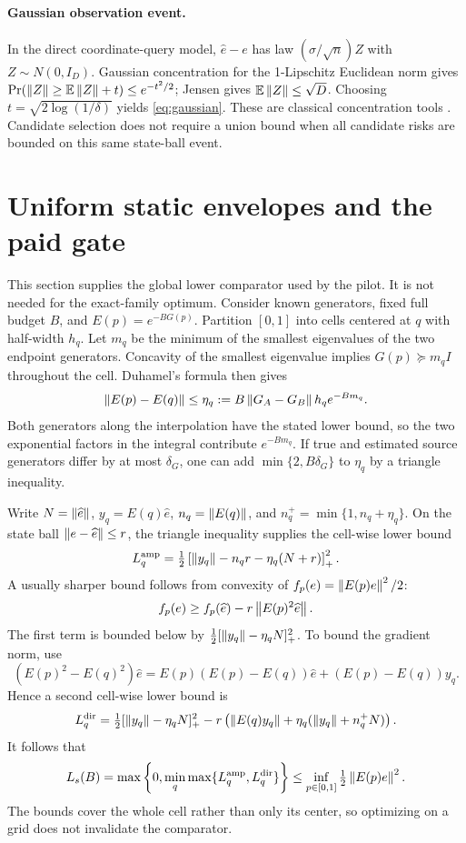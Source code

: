 \paragraph{Gaussian observation event.}
In the direct coordinate-query model, $\widehat e-e$ has law $(\sigma/\sqrt n)Z$ with $Z\sim N(0,I_D)$. Gaussian concentration for the 1-Lipschitz Euclidean norm gives $\Pr(\left\lVert Z\right\rVert\ge\mathbb E\left\lVert Z\right\rVert+t)\le e^{-t^2/2}$; Jensen gives $\mathbb E\left\lVert Z\right\rVert\le\sqrt D$. Choosing $t=\sqrt{2\log(1/\delta)}$ yields \eqref{eq:gaussian}. These are classical concentration tools \citep{boucheron2013}. Candidate selection does not require a union bound when all candidate risks are bounded on this same state-ball event.

\section{Uniform static envelopes and the paid gate}\label{app:envelope}
This section supplies the global lower comparator used by the pilot. It is not needed for the exact-family optimum. Consider known generators, fixed full budget $B$, and $E(p)=e^{-BG(p)}$. Partition $[0,1]$ into cells centered at $q$ with half-width $h_q$. Let $m_q$ be the minimum of the smallest eigenvalues of the two endpoint generators. Concavity of the smallest eigenvalue implies $G(p)\succeq m_q I$ throughout the cell. Duhamel's formula then gives
\begin{equation}
 \left\lVert E(p)-E(q)\right\rVert\le\eta_q:=B\left\lVert G_A-G_B\right\rVert h_qe^{-Bm_q}.\label{eq:cell}
\end{equation}
Both generators along the interpolation have the stated lower bound, so the two exponential factors in the integral contribute $e^{-Bm_q}$. If true and estimated source generators differ by at most $\delta_G$, one can add $\min\{2,B\delta_G\}$ to $\eta_q$ by a triangle inequality.

Write $N=\left\lVert\widehat e\right\rVert$, $y_q=E(q)\widehat e$, $n_q=\left\lVert E(q)\right\rVert$, and $n_q^+=\min\{1,n_q+\eta_q\}$. On the state ball $\left\lVert e-\widehat e\right\rVert\le r$, the triangle inequality supplies the cell-wise lower bound
\begin{equation}
 L_q^{\mathrm{amp}}=\tfrac12
 \left[\left\lVert y_q\right\rVert-n_qr-\eta_q(N+r)\right]_+^2.\label{eq:amplower}
\end{equation}
A usually sharper bound follows from convexity of $f_p(e)=\left\lVert E(p)e\right\rVert^2/2$:
\[
 f_p(e)\ge f_p(\widehat e)-r\left\lVert E(p)^2\widehat e\right\rVert.
\]
The first term is bounded below by $\frac12[\left\lVert y_q\right\rVert-\eta_qN]_+^2$. To bound the gradient norm, use
\[
 (E(p)^2-E(q)^2)\widehat e
 =E(p)(E(p)-E(q))\widehat e+(E(p)-E(q))y_q.
\]
Hence a second cell-wise lower bound is
\begin{equation}
 L_q^{\mathrm{dir}}=\tfrac12[\left\lVert y_q\right\rVert-\eta_qN]_+^2
 -r\left(\left\lVert E(q)y_q\right\rVert+\eta_q(\left\lVert y_q\right\rVert+n_q^+N)\right).
\end{equation}
It follows that
\begin{equation}
 L_s(B)=\max\left\{0,\min_q\max\{L_q^{\mathrm{amp}},L_q^{\mathrm{dir}}\}\right\}
 \le\inf_{p\in[0,1]}\tfrac12\left\lVert E(p)e\right\rVert^2.\label{eq:uniformlower}
\end{equation}
The bounds cover the whole cell rather than only its center, so optimizing on a grid does not invalidate the comparator.


